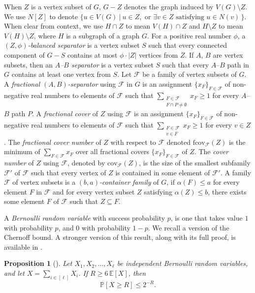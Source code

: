 \documentclass[11pt]{amsart}
\newtheorem{proposition}[theorem]{Proposition}
\begin{document}
When $Z$ is a vertex subset of $G$, $G-Z$ denotes the graph induced by $V(G)\setminus Z$.
%
We use $N[Z]$ to denote $\{u\in V(G)\ |\ u\in Z, \text{ or } \exists v\in Z \text{ satisfying } u\in N(v)\,\}$. 
When clear from context, we use $H\cap Z$ to mean $V(H)\cap Z$ and $H\setminus Z$ to mean $V(H)\setminus Z$, where $H$ is a subgraph of a graph $G$.
%
For a positive real number $\phi$, a \emph{$(Z,\phi)$-balanced separator} is a vertex subset $S$ such that every connected component of $G-S$ contains at most $\phi \cdot |Z|$ vertices from $Z$.
%
If $A$, $B$ are vertex subsets, then an \emph{$A$--$B$ separator} is a vertex subset $S$ such that every $A$--$B$ path in $G$ contains at least one vertex from $S$.
%
Let $\mathcal{F}$ be a family of vertex subsets of $G$. A \emph{fractional $(A,B)$-separator} using $\mathcal{F}$ in $G$ is an assignment $\{x_F\}_{F\in\mathcal{F}}$ of non-negative real numbers to elements of $\mathcal{F}$ such that $\sum_{\substack{F\in\mathcal{F}\\ F\cap P\neq\emptyset}}x_F \geq 1$ for every $A$--$B$ path $P$. 
% 
A \emph{fractional cover} of $Z$ using $\mathcal{F}$ is an assignment $\{x_F\}_{F \in \mathcal{F}}$ of non-negative real numbers to elements of $\mathcal{F}$ such that $\sum_{\substack{F \in \mathcal{F} \\ v \in F}} x_F \geq 1$ for every $v \in Z$. 
%
The \emph{fractional cover number} of $Z$ with respect to $\mathcal{F}$ denoted $\mathrm{fcov}_{\mathcal{F}}(Z)$ is the minimum of $\sum_{F\in\mathcal{F}}x_F$ over all fractional covers $\{x_F\}_{F \in \mathcal{F}}$ of $Z$.
%
%
The \emph{cover number} of $Z$ using $\mathcal{F}$, denoted by $\mathrm{cov}_{\mathcal{F}}(Z)$, is the size of the smallest subfamily $\mathcal{F}'$ of $\mathcal{F}$ such that every vertex of $Z$ is contained in some element of $\mathcal{F}'$.
%
A family $\mathcal{F}$ of vertex subsets is a \emph{$(b,a)$-container family} of $G$, if $\alpha(F)\leq a$ for every element $F$ in $\mathcal{F}$ and for every vertex subset $Z$ satisfying $\alpha(Z) \leq b$, there exists some element $F$ of $\mathcal{F}$ such that $Z\subseteq F$.


A \emph{Bernoulli random variable} with success probability $p$, is one that takes value $1$ with probability $p$, and $0$ with probability $1-p$. 
We recall a version of the Chernoff bound. A stronger version of this result, along with its full proof, is available in \cite{mitzenmacher2017probability}.
\begin{proposition}[\cite{hagerup1990guided,mitzenmacher2017probability}]\label{thm:chernoff}
    Let $X_1, X_2, \dots, X_\ell$ be independent Bernoulli random variables, and let $X = \sum_{i \in [\ell]} X_i$. If $R \geq 6\,\mathbb{E}[X]$, then
    $$
    \mathbb{P}[X \geq R] \leq 2^{-R}.
    $$
\end{proposition}
\end{document}
